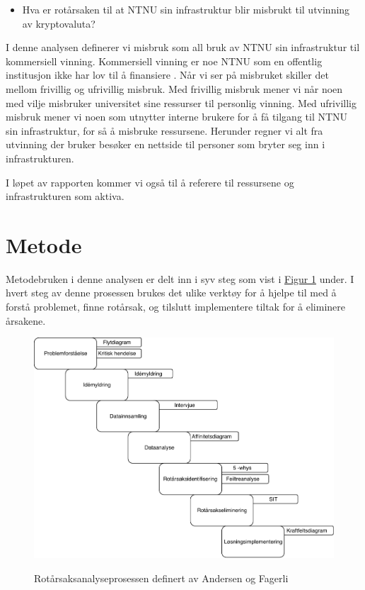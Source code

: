 \begin{itemize}
    \item Hva er rotårsaken til at NTNU sin infrastruktur blir misbrukt til utvinning av kryptovaluta?
\end{itemize}

I denne analysen definerer vi misbruk som all bruk av NTNU sin infrastruktur til kommersiell vinning. Kommersiell vinning er noe NTNU som en offentlig institusjon ikke har lov til å finansiere \cite{ITReg}. Når vi ser på misbruket skiller det mellom frivillig og ufrivillig misbruk. Med frivillig misbruk mener vi når noen med vilje misbruker universitet sine ressurser til personlig vinning. Med ufrivillig misbruk mener vi noen som utnytter interne brukere for å få tilgang til NTNU sin infrastruktur, for så å misbruke ressursene. Herunder regner vi alt fra utvinning der bruker besøker en nettside til personer som bryter seg inn i infrastrukturen.


I løpet av rapporten kommer vi også til å referere til ressursene og infrastrukturen som aktiva. 
\section{Metode}
Metodebruken i denne analysen er delt inn i syv steg som vist i \hyperref[fig:prosess]{Figur 1} under. I hvert steg av denne prosessen brukes det ulike verktøy for å hjelpe til med å forstå problemet, finne rotårsak, og tilslutt implementere tiltak for å eliminere årsakene. 
\begin{figure}[H]
    \centering
    \includegraphics[scale=0.7]{case_3/bilder/Prosess_case_3.pdf}
    \label{fig:prosess}
    \caption[Rotårsaksanalyseprosessen]{Rotårsaksanalyseprosessen definert av Andersen og Fagerli}
\end{figure}